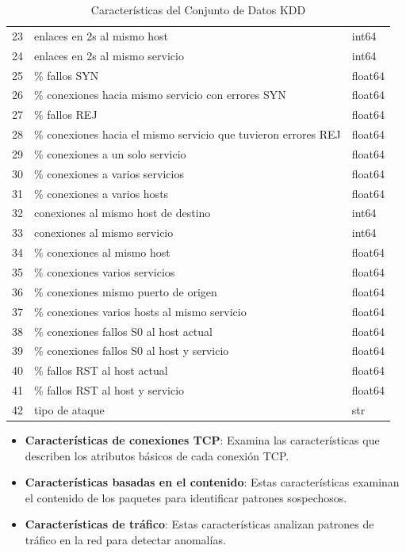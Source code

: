 \begin{table}[h!]
\begin{tabular}{|c|l|l|}
        \hline
        23 & enlaces en 2s al mismo host & int64 \\
        24 & enlaces en 2s al mismo servicio & int64 \\
        25 & \% fallos SYN & float64 \\
        26 & \%  conexiones hacia mismo servicio con errores SYN & float64 \\
        27 & \% fallos REJ & float64 \\
        28 & \%  conexiones hacia el mismo servicio que tuvieron errores REJ & float64 \\
        29 & \% conexiones a un solo servicio & float64 \\
        30 & \% conexiones a varios servicios & float64 \\
        31 & \% conexiones a varios hosts & float64 \\
        32 & conexiones al mismo host de destino & int64 \\
        33 & conexiones al mismo servicio & int64 \\
        34 & \% conexiones al mismo host & float64 \\
        35 & \% conexiones varios servicios & float64 \\
        36 & \% conexiones mismo puerto de origen & float64 \\
        37 & \% conexiones varios hosts al mismo servicio & float64 \\
        38 & \% conexiones fallos S0 al host actual & float64 \\
        39 & \% conexiones fallos S0 al host y servicio & float64 \\
        40 & \% fallos RST al host actual & float64 \\
        41 & \% fallos RST al host y servicio & float64 \\
        42 & tipo de ataque & str \\
        \hline
    \end{tabular}
    \caption{Características del Conjunto de Datos KDD}
    \label{tab: caracKDD}
\end{table}

\begin{itemize}
    \item \textbf{Características de conexiones TCP}: Examina las características que describen los atributos básicos de cada conexión TCP.
    \item \textbf{Características basadas en el contenido}: Estas características examinan el contenido de los paquetes para identificar patrones sospechosos.
    \item \textbf{Características de tráfico}: Estas características analizan patrones de tráfico en la red para detectar anomalías.
\end{itemize}


